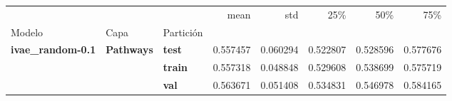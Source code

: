 \begin{tabular}{lllrrrrr}
\toprule
 &  &  & mean & std & 25\% & 50\% & 75\% \\
Modelo & Capa & Partición &  &  &  &  &  \\
\midrule
\multirow[t]{3}{*}{\textbf{ivae\_random-0.1}} & \multirow[t]{3}{*}{\textbf{Pathways}} & \textbf{test} & 0.557457 & 0.060294 & 0.522807 & 0.528596 & 0.577676 \\
\textbf{} & \textbf{} & \textbf{train} & 0.557318 & 0.048848 & 0.529608 & 0.538699 & 0.575719 \\
\textbf{} & \textbf{} & \textbf{val} & 0.563671 & 0.051408 & 0.534831 & 0.546978 & 0.584165 \\
\cline{1-8} \cline{2-8}
\bottomrule
\end{tabular}
